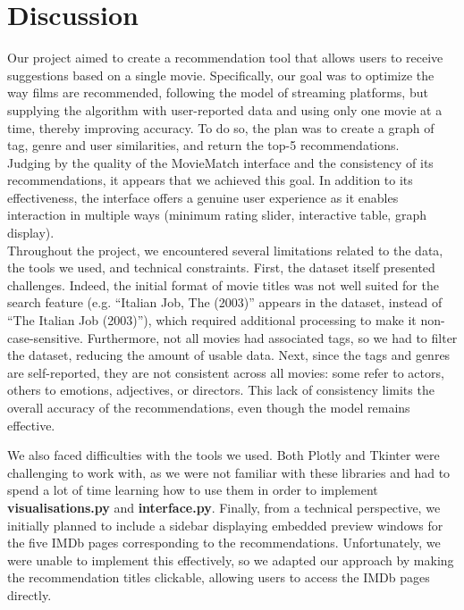 \documentclass[fontsize=11pt]{article}
\begin{document}
\section*{Discussion}

Our project aimed to create a recommendation tool that allows users to receive suggestions based on a single movie. Specifically, our goal was to optimize the way films are recommended, following the model of streaming platforms, but supplying the algorithm with user-reported data and using only one movie at a time, thereby improving accuracy. To do so, the plan was to create a graph of tag, genre and user similarities, and return the top-5 recommendations. \\
Judging by the quality of the MovieMatch interface and the consistency of its recommendations, it appears that we achieved this goal. In addition to its effectiveness, the interface offers a genuine user experience as it enables interaction in multiple ways (minimum rating slider, interactive table, graph display). \\

Throughout the project, we encountered several limitations related to the data, the tools we used, and technical constraints. First, the dataset itself presented challenges. Indeed, the initial format of movie titles was not well suited for the search feature (e.g. “Italian Job, The (2003)” appears in the dataset, instead of “The Italian Job (2003)”), which required additional processing to make it non-case-sensitive. Furthermore, not all movies had associated tags, so we had to filter the dataset, reducing the amount of usable data. Next, since the tags and genres are self-reported, they are not consistent across all movies: some refer to actors, others to emotions, adjectives, or directors. This lack of consistency limits the overall accuracy of the recommendations, even though the model remains effective.

We also faced difficulties with the tools we used. Both Plotly and Tkinter were challenging to work with, as we were not familiar with these libraries and had to spend a lot of time learning how to use them in order to implement \textbf{visualisations.py} and \textbf{interface.py}. Finally, from a technical perspective, we initially planned to include a sidebar displaying embedded preview windows for the five IMDb pages corresponding to the recommendations. Unfortunately, we were unable to implement this effectively, so we adapted our approach by making the recommendation titles clickable, allowing users to access the IMDb pages directly.\\
\end{document}
